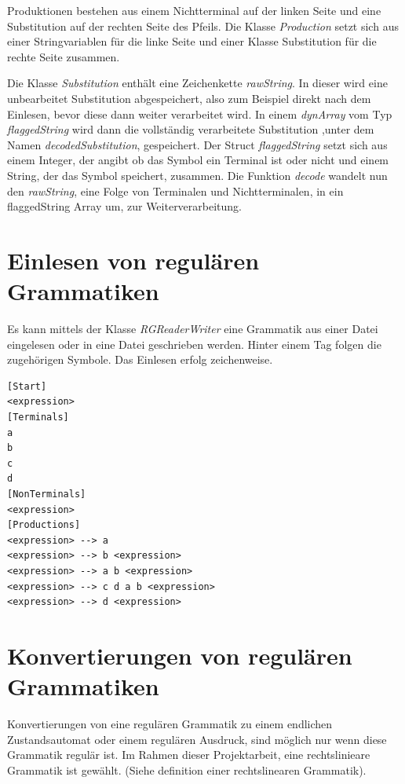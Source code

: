 Produktionen bestehen aus einem Nichtterminal auf der linken Seite und eine
Substitution auf der rechten Seite des Pfeils. Die Klasse \textit{Production}
setzt sich aus einer Stringvariablen für die linke Seite und einer Klasse
Substitution für die rechte Seite zusammen.

Die Klasse \textit{Substitution} enthält eine Zeichenkette \textit{rawString}.
In dieser wird eine unbearbeitet Substitution abgespeichert, also zum Beispiel
direkt nach dem Einlesen, bevor diese dann weiter verarbeitet wird. In einem
\textit{dynArray} vom Typ \textit{flaggedString} wird dann die vollständig
verarbeitete Substitution ,unter dem Namen \textit{decodedSubstitution},
gespeichert. Der Struct \textit{flaggedString} setzt sich aus einem Integer,
der angibt ob das Symbol ein Terminal ist oder nicht und einem String, der das
Symbol speichert, zusammen. Die Funktion \textit{decode} wandelt nun den
\textit{rawString}, eine Folge von Terminalen und Nichtterminalen, in ein
flaggedString Array um, zur Weiterverarbeitung.

\section{Einlesen von regulären Grammatiken}

Es kann mittels der Klasse \textit{RGReaderWriter} eine Grammatik aus einer
Datei eingelesen oder in eine Datei geschrieben werden. Hinter einem Tag folgen die
zugehörigen Symbole. Das Einlesen erfolg zeichenweise.

\lstset{language=C, basicstyle=\footnotesize}
\begin{lstlisting}[float=h!, frame=tb, captionpos=b, caption={Beispiel zu
einem Textdatei der einen Grammatik darsttellt.}, label=list:TextGrammar]
[Start]
<expression>
[Terminals]
a
b
c
d
[NonTerminals]
<expression>
[Productions]
<expression> --> a
<expression> --> b <expression>
<expression> --> a b <expression>
<expression> --> c d a b <expression>
<expression> --> d <expression>
\end{lstlisting}

\section{Konvertierungen von regulären Grammatiken}

Konvertierungen von eine regulären Grammatik zu einem endlichen Zustandsautomat
oder einem regulären Ausdruck, sind möglich nur wenn diese Grammatik regulär
ist. Im Rahmen dieser Projektarbeit, eine rechtslinieare Grammatik ist gewählt.
(Siehe definition einer rechtslinearen Grammatik).

